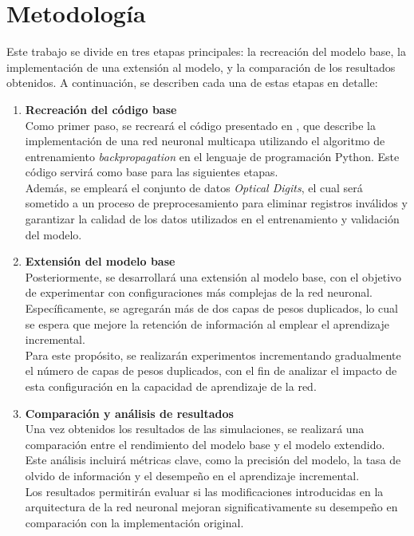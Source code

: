 \section{Metodología}

Este trabajo se divide en tres etapas principales: la recreación del modelo base, la implementación de una extensión al modelo, y la comparación de los resultados obtenidos. A continuación, se describen cada una de estas etapas en detalle:

\begin{enumerate}
    \item \textbf{Recreación del código base} \\
    Como primer paso, se recreará el código presentado en \cite{bullinaria2009}, que describe la implementación de una red neuronal multicapa utilizando el algoritmo de entrenamiento \textit{backpropagation} en el lenguaje de programación Python. Este código servirá como base para las siguientes etapas. \\
    Además, se empleará el conjunto de datos \textit{Optical Digits}, el cual será sometido a un proceso de preprocesamiento para eliminar registros inválidos y garantizar la calidad de los datos utilizados en el entrenamiento y validación del modelo.

    \item \textbf{Extensión del modelo base} \\
    Posteriormente, se desarrollará una extensión al modelo base, con el objetivo de experimentar con configuraciones más complejas de la red neuronal. Específicamente, se agregarán más de dos capas de pesos duplicados, lo cual se espera que mejore la retención de información al emplear el aprendizaje incremental. \\
    Para este propósito, se realizarán experimentos incrementando gradualmente el número de capas de pesos duplicados, con el fin de analizar el impacto de esta configuración en la capacidad de aprendizaje de la red.

    \item \textbf{Comparación y análisis de resultados} \\
    Una vez obtenidos los resultados de las simulaciones, se realizará una comparación entre el rendimiento del modelo base y el modelo extendido. Este análisis incluirá métricas clave, como la precisión del modelo, la tasa de olvido de información y el desempeño en el aprendizaje incremental. \\
    Los resultados permitirán evaluar si las modificaciones introducidas en la arquitectura de la red neuronal mejoran significativamente su desempeño en comparación con la implementación original.
\end{enumerate}



